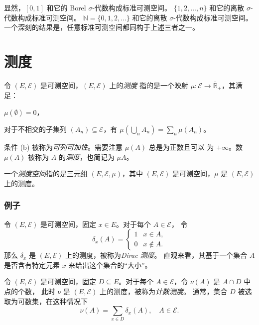 \documentclass[fontset=none]{Notes}
\begin{document}
显然，$[0,1]$ 和它的 Borel $\sigma$-代数构成标准可测空间。
$\{1,2,\dots,n\}$ 和它的离散 $\sigma$-代数构成标准可测空间。
$\mathbb{N}=\{0,1,2,\dots\}$ 和它的离散 $\sigma$-代数构成标准可测空间。
一个深刻的结果是，任意标准可测空间都同构于上述三者之一。


\section{测度}

令 $(E,\mathcal{E})$ 是可测空间，$(E,\mathcal{E})$ 上的\emph{测度}
指的是一个映射 $\mu:\mathcal{E}\to\bar{\mathbb{R}}_+$，其满足：
\begin{alphenum}
  \item $\mu(\emptyset)=0$，
  \item 对于不相交的子集列 $(A_n)\subseteq \mathcal{E}$，有 
  $\mu(\bigcup_n A_n)=\sum_n \mu(A_n)$。
\end{alphenum}
条件 (b) 被称为\emph{可列可加性}。需要注意 $\mu(A)$ 总是为正数且可以
为 $+\infty$。数 $\mu(A)$ 被称为 $A$ 的\emph{测度}，也简记为 $\mu A$。

一个\emph{测度空间}指的是三元组 $(E,\mathcal{E},\mu)$，其中 $(E,\mathcal{E})$
是可测空间，$\mu$ 是 $(E,\mathcal{E})$ 上的测度。

\subsubsection{例子}

\begin{example}[Dirac 测度]
  令 $(E,\mathcal{E})$ 是可测空间，固定 $x\in E$。对于每个 $A\in \mathcal{E}$，
  令
  \[
    \delta_x(A)=\begin{cases}
      1 & x\in A,\\
      0 & x\notin A.
    \end{cases}  
  \]
  那么 $\delta_x$ 是 $(E,\mathcal{E})$ 上的测度，被称为\emph{Dirac 测度}。
  直观来看，其基于一个集合 $A$ 是否含有特定元素 $x$ 来给出这个集合的“大小”。
\end{example}

\begin{example}[计数测度]
  令 $(E,\mathcal{E})$ 是可测空间，固定 $D\subseteq E$。对于每个
  $A\in \mathcal{E}$，令 $\nu(A)$ 是 $A\cap D$ 中点的个数，
  此时 $\nu$ 是 $(E,\mathcal{E})$ 上的测度，被称为\emph{计数测度}。
  通常，集合 $D$ 被选取为可数集，在这种情况下
  \[
    \nu(A)=\sum_{x\in D}\delta_x(A),\quad A\in \mathcal{E}.  
  \]
\end{example}
\end{document}

